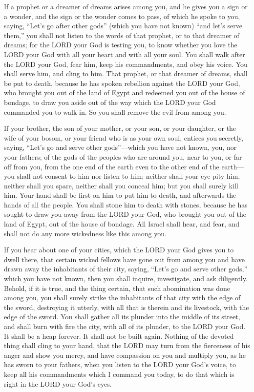 \mychapter{} \myverse*{}If a prophet or a dreamer of dreams arises among you, and he gives
you a sign or a wonder,
\myverse{}and the sign or the wonder comes to pass, of which he spoke to you, saying,
“Let’s go after other gods” (which you have not known) “and let’s serve them,”
\myverse{}you shall not listen to the words of that prophet, or to that dreamer of dreams;
for the LORD your God is testing you, to know whether you love the LORD your God with all your heart and
with all your soul.
\myverse{}You shall walk after the LORD your God, fear him, keep his commandments, and
obey his voice. You shall serve him, and cling to him.
\myverse{}That prophet, or that dreamer of dreams, shall be put to death, because he
has spoken rebellion against the LORD your God, who brought you out of the land of Egypt and redeemed
you out of the house of bondage, to draw you aside out of the way which the LORD your God commanded you
to walk in. So you shall remove the evil from among you.


\myverse{}If your brother, the son of your mother, or your son, or your
daughter, or the wife of your bosom, or your friend who is as your own soul, entices you secretly, saying,
“Let’s go and serve other gods”—which you have not known, you, nor your fathers;
\myverse{}of the gods of the peoples who are around you, near to you, or far off from
you, from the one end of the earth even to the other end of the earth—
\myverse{}you shall not consent to him nor listen to him; neither shall your eye pity
him, neither shall you spare, neither shall you conceal him;
\myverse{}but you shall surely kill him. Your hand shall be first on him to put him to
death, and afterwards the hands of all the people.
\myverse{}You shall stone him to death with stones, because he has sought to draw you
away from the LORD your God, who brought you out of the land of Egypt, out of the house of bondage.
\myverse{}All Israel shall hear, and fear, and shall not do any more wickedness like
this among you.


\myverse{}If you hear about one of your cities, which the LORD your God
gives you to dwell there, that
\myverse{}certain wicked fellows have gone out from among you and have drawn away the
inhabitants of their city, saying, “Let’s go and serve other gods,” which you have not known,
\myverse{}then you shall inquire, investigate, and ask diligently. Behold, if it is
true, and the thing certain, that such abomination was done among you,
\myverse{}you shall surely strike the inhabitants of that city with the edge of the
sword, destroying it utterly, with all that is therein and its livestock, with the edge of the sword.
\myverse{}You shall gather all its plunder into the middle of its street, and shall
burn with fire the city, with all of its plunder, to the LORD your God. It shall be a heap forever. It
shall not be built again.
\myverse{}Nothing of the devoted thing shall cling to your hand, that the LORD may
turn from the fierceness of his anger and show you mercy, and have compassion on you and multiply you,
as he has sworn to your fathers,
\myverse{}when you listen to the LORD your God’s voice, to keep all his commandments
which I command you today, to do that which is right in the LORD your God’s eyes.


